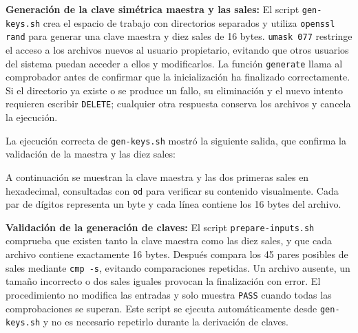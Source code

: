 \textbf{Generación de la clave simétrica maestra y las sales:}
El script \texttt{gen-keys.sh} crea el espacio de trabajo con directorios separados y utiliza \texttt{openssl rand} para generar una clave maestra y diez sales de 16 bytes. 
\texttt{umask 077} restringe el acceso a los archivos nuevos al usuario propietario, evitando que otros usuarios del sistema puedan acceder a ellos y modificarlos.
La función \texttt{generate} llama al comprobador antes de confirmar que la inicialización ha finalizado correctamente.
Si el directorio ya existe o se produce un fallo, su eliminación y el nuevo intento requieren escribir \texttt{DELETE}; cualquier otra respuesta conserva los archivos y cancela la ejecución.

\begingroup
\renewcommand{\lstlistingname}{Script}

\endgroup

La ejecución correcta de \texttt{gen-keys.sh} mostró la siguiente salida, que confirma la validación de la maestra y las diez sales:

\begingroup
\renewcommand{\lstlistingname}{Salida y verificación}

\endgroup

A continuación se muestran la clave maestra y las dos primeras sales en hexadecimal, consultadas con \texttt{od} para verificar su contenido visualmente.
Cada par de dígitos representa un byte y cada línea contiene los 16 bytes del archivo.

\begingroup
{}

\endgroup

\textbf{Validación de la generación de claves:} El script \texttt{prepare-inputs.sh} comprueba que existen tanto la clave maestra como las diez sales, y que cada archivo contiene exactamente 16 bytes.
Después compara los 45 pares posibles de sales mediante \texttt{cmp -s}, evitando comparaciones repetidas.
Un archivo ausente, un tamaño incorrecto o dos sales iguales provocan la finalización con error.
El procedimiento no modifica las entradas y solo muestra \texttt{PASS} cuando todas las comprobaciones se superan.
Este script se ejecuta automáticamente desde \texttt{gen-keys.sh} y no es necesario repetirlo durante la derivación de claves.

